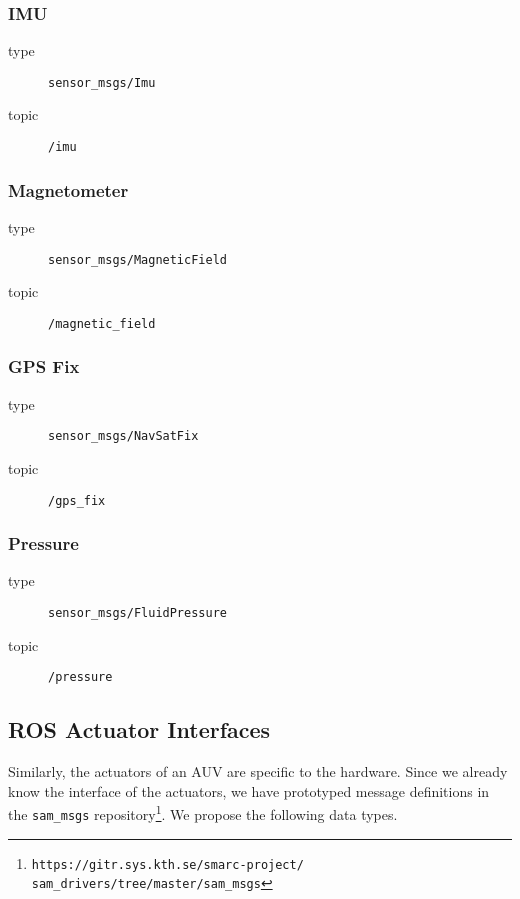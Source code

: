 \documentclass[9pt,technote]{IEEEtran} %
\begin{document}
\subsubsection{IMU}

\begin{description}
\item[type] \texttt{sensor\_msgs/Imu}
\item[topic] \texttt{/imu}
\end{description}

\subsubsection{Magnetometer}

\begin{description}
\item[type] \texttt{sensor\_msgs/MagneticField}
\item[topic] \texttt{/magnetic\_field}
\end{description}

\subsubsection{GPS Fix} 

\begin{description}
\item[type] \texttt{sensor\_msgs/NavSatFix}
\item[topic] \texttt{/gps\_fix}
\end{description}

\subsubsection{Pressure} 

\begin{description}
\item[type] \texttt{sensor\_msgs/FluidPressure}
\item[topic] \texttt{/pressure}
\end{description}

\subsection{ROS Actuator Interfaces}

Similarly, the actuators of an AUV are specific to the hardware.
Since we already know the interface of the actuators, we
have prototyped message definitions in the \texttt{sam\_msgs}
repository\footnote{\texttt{https://gitr.sys.kth.se/smarc-project/\\sam\_drivers/tree/master/sam\_msgs}}.
We propose the following data types.
\end{document}
